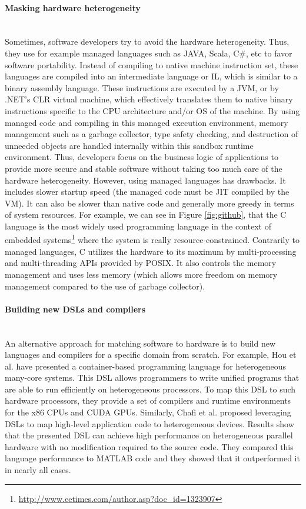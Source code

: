 \paragraph{Masking hardware heterogeneity}~\\ 
Sometimes, software developers try to avoid the hardware heterogeneity. Thus, they use for example managed languages such as JAVA, Scala, C\#, etc to favor software portability. Instead of compiling to native machine instruction set, these languages are compiled into an intermediate language or IL, which is similar to a binary assembly language. These instructions are executed by a JVM, or by .NET's CLR virtual machine, which effectively translates them to native binary instructions specific to the CPU architecture and/or OS of the machine.
By using managed code and compiling in this managed execution environment, memory management such as a garbage collector, type safety checking, and destruction of unneeded objects are handled internally within this sandbox runtime environment. Thus, developers focus on the business logic of applications to provide more secure and stable software without taking too much care of the hardware heterogeneity.
However, using managed languages has drawbacks. It includes slower startup speed (the managed code must be JIT compiled by the VM). It can also be slower than native code and generally more greedy in terms of system resources. 
For example, we can see in Figure \ref{fig:github}, that the C language is the most widely used programming language in the context of embedded systems\footnote{\url{http://www.eetimes.com/author.asp?doc_id=1323907}} where the system is really resource-constrained. Contrarily to managed languages, C utilizes the hardware to its maximum by multi-processing and multi-threading APIs provided by POSIX. It also controls the memory management and uses less memory (which allows more freedom on memory management compared to the use of garbage collector).   


\paragraph{Building new DSLs and compilers}~\\ 
An alternative approach for matching software to hardware is to build new languages and compilers for a specific domain from scratch. 
For example, Hou et al.\cite{hou2010spap} have presented a container-based programming language for heterogeneous many-core systems. This DSL allows programmers to write unified programs that are able to run efficiently on heterogeneous processors. To map this DSL to such hardware processors, they provide a set of compilers and runtime environments for the x86 CPUs
and CUDA GPUs. Similarly, Chafi et al.\cite{chafi2010language,chafi2011domain} proposed leveraging DSLs to map high-level application code to heterogeneous devices. Results show that the presented DSL can achieve high performance on heterogeneous parallel hardware with no modification required to the source code. They compared this language performance to MATLAB code and they showed that it outperformed it in nearly all cases.

